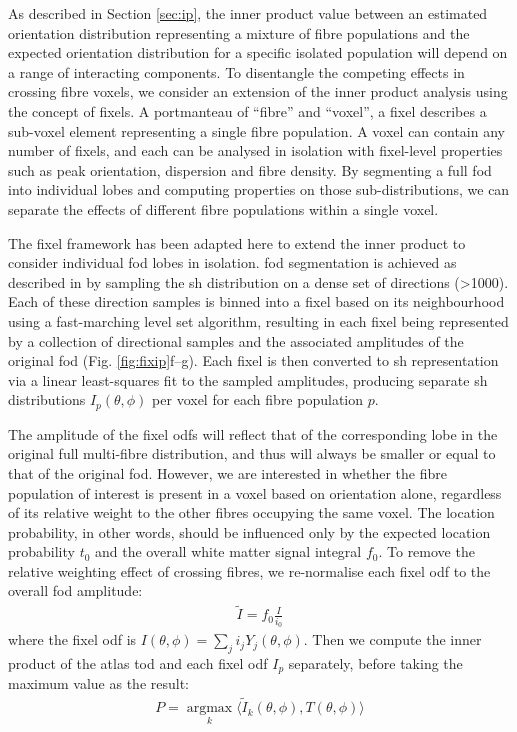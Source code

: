 As described in Section \ref{sec:ip}, the inner product value between an estimated orientation distribution representing a mixture of fibre populations and the expected orientation distribution for a specific isolated population will depend on a range of interacting components.
To disentangle the competing effects in crossing fibre voxels, we consider an extension of the inner product analysis using the concept of fixels.
A portmanteau of ``fibre'' and ``voxel'', a fixel describes a sub-voxel element representing a single fibre population\autocite{Raffelt2015,Raffelt2017}.
A voxel can contain any number of fixels, and each can be analysed in isolation with fixel-level properties such as peak orientation, dispersion and fibre density.
By segmenting a full \gls{fod} into individual lobes and computing properties on those sub-distributions, we can separate the effects of different fibre populations within a single voxel.

The fixel framework has been adapted here to extend the inner product to consider individual \gls{fod} lobes in isolation.
\Gls{fod} segmentation is achieved as described in \textcite{Smith2013} by sampling the \gls{sh} distribution on a dense set of directions (\textgreater 1000).
Each of these direction samples is binned into a fixel based on its neighbourhood using a fast-marching level set algorithm, resulting in each fixel being represented by a collection of directional samples and the associated amplitudes of the original \gls{fod} (Fig. \ref{fig:fixip}f--g).
Each fixel is then converted to \gls{sh} representation via a linear least-squares fit to the sampled amplitudes, producing separate \gls{sh} distributions $I_p(\theta, \phi)$ per voxel for each fibre population $p$.

The amplitude of the fixel \glspl{odf} will reflect that of the corresponding lobe in the original full multi-fibre distribution, and thus will always be smaller or equal to that of the original \gls{fod}.
However, we are interested in whether the fibre population of interest is present in a voxel based on orientation alone, regardless of its relative weight to the other fibres occupying the same voxel.
The location probability, in other words, should be influenced only by the expected location probability $t_0$ and the overall white matter signal integral $f_0$.
To remove the relative weighting effect of crossing fibres, we re-normalise each fixel \gls{odf} to the overall \gls{fod} amplitude:
\begin{align}
  \widetilde{I} = f_0\frac{I}{i_0}
\end{align}
where the fixel \gls{odf} is $I(\theta, \phi) = \sum_j i_j Y_j(\theta,\phi)$.
Then we compute the inner product of the atlas \gls{tod} and each fixel \gls{odf} $I_p$ separately, before taking the maximum value as the result:
\begin{align}
  P = \operatorname*{argmax}_k \langle \widetilde{I}_k(\theta,\phi), T(\theta,\phi) \rangle
\end{align}

